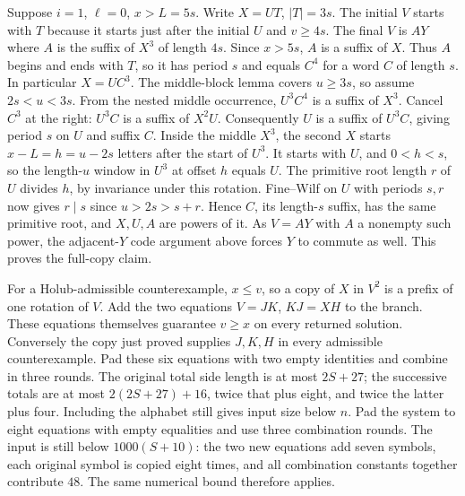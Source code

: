Suppose $i=1$, $\ell=0$, $x>L=5s$. Write $X=UT$, $|T|=3s$.
The initial $V$ starts with $T$ because it starts just after the initial
$U$ and $v\ge4s$. The final $V$ is $AY$ where $A$ is the suffix of
$X^3$ of length $4s$. Since $x>5s$, $A$ is a suffix of $X$.
Thus $A$ begins and ends with $T$, so it has period $s$ and equals
$C^4$ for a word $C$ of length $s$. In particular $X=UC^3$.
The middle-block lemma covers $u\ge3s$, so assume $2s<u<3s$.
From the nested middle occurrence, $U^3 C^4$ is a suffix of $X^3$.
Cancel $C^3$ at the right: $U^3 C$ is a suffix of $X^2 U$.
Consequently $U$ is a suffix of $U^3 C$, giving period $s$ on $U$
and suffix $C$. Inside the middle $X^3$, the second $X$ starts
$x-L=h=u-2s$ letters after the start of $U^3$. It starts with $U$,
and $0<h<s$, so the length-$u$ window in $U^3$ at offset $h$ equals
$U$. The primitive root length $r$ of $U$ divides $h$, by invariance
under this rotation. Fine--Wilf on $U$ with periods $s,r$ now gives
$r\mid s$ since $u>2s>s+r$. Hence $C$, its length-$s$ suffix, has
the same primitive root, and $X,U,A$ are powers of it. As $V=AY$ with
$A$ a nonempty such power, the adjacent-$Y$ code argument above forces
$Y$ to commute as well. This proves the full-copy claim.

For a Holub-admissible counterexample, $x\le v$, so a copy of $X$
in $V^2$ is a prefix of one rotation of $V$. Add the two equations
$V=JK$, $KJ=XH$ to the branch. These equations themselves guarantee
$v\ge x$ on every returned solution. Conversely the copy just proved
supplies $J,K,H$ in every admissible counterexample. Pad these six
equations with two empty identities and combine in three rounds.
The original total side length is at most $2S+27$; the successive
totals are at most $2(2S+27)+16$, twice that plus eight, and twice
the latter plus four. Including the alphabet still gives input size
below $n$. Pad the system
to eight equations with empty equalities and use three combination
rounds. The input is still below $1000(S+10)$: the two new equations
add seven symbols, each original symbol is copied eight times, and
all combination constants together contribute $48$. The same numerical
bound therefore applies.

